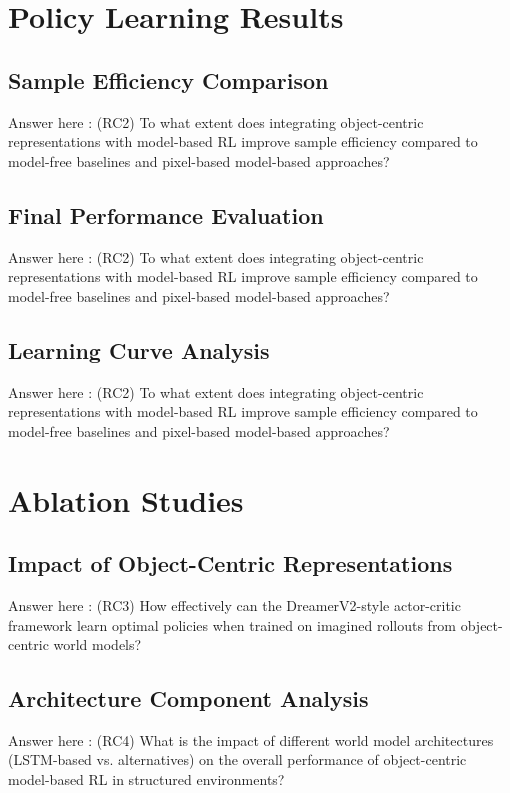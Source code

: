 \documentclass[
	english,
	ruledheaders=section,
	class=report,
	thesis={type=master},
	accentcolor=9c,
	custommargins=true,
	marginpar=false,
	parskip=half-,
	fontsize=11pt,
]{tudapub}
\begin{document}
\section{Policy Learning Results}
\label{sec:policy_results}

\subsection{Sample Efficiency Comparison}
\label{subsec:sample_efficiency_comp}
Answer here : (RC2) To what extent does integrating object-centric representations with model-based RL improve sample efficiency compared to model-free baselines and pixel-based model-based approaches?


\subsection{Final Performance Evaluation}
\label{subsec:final_performance}
Answer here : (RC2) To what extent does integrating object-centric representations with model-based RL improve sample efficiency compared to model-free baselines and pixel-based model-based approaches?


\subsection{Learning Curve Analysis}
\label{subsec:learning_curves}
Answer here : (RC2) To what extent does integrating object-centric representations with model-based RL improve sample efficiency compared to model-free baselines and pixel-based model-based approaches?


\section{Ablation Studies}
\label{sec:ablation_studies}

\subsection{Impact of Object-Centric Representations}
\label{subsec:oc_impact}
Answer here : (RC3) How effectively can the DreamerV2-style actor-critic framework learn optimal policies when trained on imagined rollouts from object-centric world models?


\subsection{Architecture Component Analysis}
\label{subsec:architecture_analysis}
Answer here : (RC4) What is the impact of different world model architectures (LSTM-based vs. alternatives) on the overall performance of object-centric model-based RL in structured environments?
\end{document}
